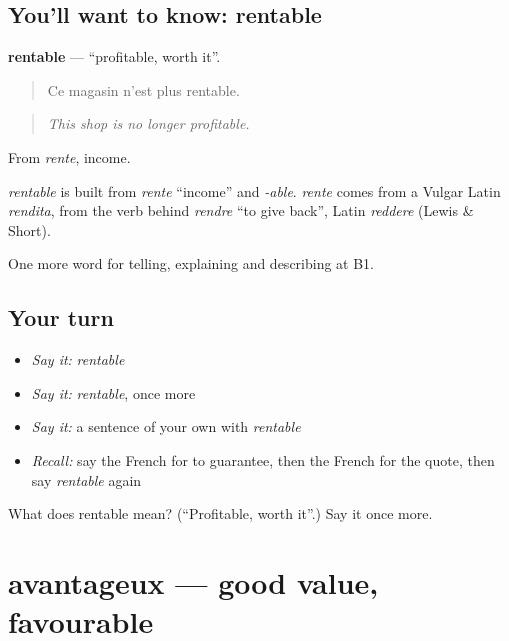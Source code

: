 \subsection*{You'll want to know: rentable}
\textbf{rentable} — \textquotedblleft{}profitable, worth it\textquotedblright{}.

\begin{quote}
Ce magasin n'est plus rentable.
\end{quote}

\begin{quote}
\emph{This shop is no longer profitable.}
\end{quote}

From \emph{rente}, income.

\begin{cousinweb}
\emph{rentable} is built from \emph{rente} \textquotedblleft{}income\textquotedblright{} and \emph{-able}. \emph{rente} comes from a Vulgar Latin \emph{rendita}, from the verb behind \emph{rendre} \textquotedblleft{}to give back\textquotedblright{}, Latin \emph{reddere} (Lewis \& Short).
\end{cousinweb}

\begin{grammarlens}[title={What you've built}]
One more word for telling, explaining and describing at B1.
\end{grammarlens}

\subsection*{Your turn}
\begin{itemize}
\raggedright
  \item \emph{Say it:} \emph{rentable}
  \item \emph{Say it:} \emph{rentable}, once more
  \item \emph{Say it:} a sentence of your own with \emph{rentable}
  \item \emph{Recall:} say the French for to guarantee, then the French for the quote, then say \emph{rentable} again
\end{itemize}

\begin{tcolorbox}[breakable,colback=teal!4,colframe=teal!35!black,title={Before you move on}]
What does rentable mean? (\textquotedblleft{}Profitable, worth it\textquotedblright{}.) Say it once more.
\end{tcolorbox}
\section[avantageux]{avantageux — good value, favourable}

